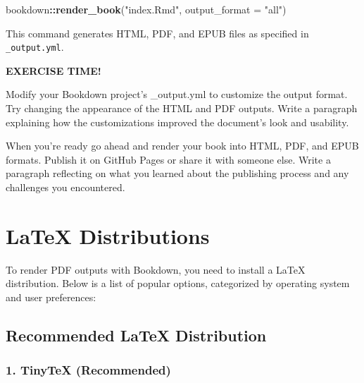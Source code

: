 \documentclass[
]{book}
\newenvironment{Shaded}{\begin{snugshade}}{\end{snugshade}}
\newcommand{\AttributeTok}[1]{\textcolor[rgb]{0.13,0.29,0.53}{#1}}
\newcommand{\FunctionTok}[1]{\textcolor[rgb]{0.13,0.29,0.53}{\textbf{#1}}}
\newcommand{\NormalTok}[1]{#1}
\newcommand{\SpecialCharTok}[1]{\textcolor[rgb]{0.81,0.36,0.00}{\textbf{#1}}}
\newcommand{\StringTok}[1]{\textcolor[rgb]{0.31,0.60,0.02}{#1}}
\newenvironment{blackbox}{
  \definecolor{shadecolor}{rgb}{0, 0, 0}  %
  \color{white}
  \begin{shaded}}
 {\end{shaded}}
\theoremstyle{definition}
\theoremstyle{definition}
\theoremstyle{definition}
\theoremstyle{definition}
\theoremstyle{remark}
\begin{document}
\begin{Shaded}
\begin{Highlighting}[]
\NormalTok{bookdown}\SpecialCharTok{::}\FunctionTok{render\_book}\NormalTok{(}\StringTok{"index.Rmd"}\NormalTok{, }\AttributeTok{output\_format =} \StringTok{"all"}\NormalTok{)}
\end{Highlighting}
\end{Shaded}

This command generates HTML, PDF, and EPUB files as specified in \texttt{\_output.yml}.

\begin{blackbox}

\begin{center}
\textbf{EXERCISE TIME!}

\end{center}

Modify your Bookdown project's \_output.yml to customize the output format. Try changing the appearance of the HTML and PDF outputs. Write a paragraph explaining how the customizations improved the document's look and usability.

When you're ready go ahead and render your book into HTML, PDF, and EPUB formats. Publish it on GitHub Pages or share it with someone else. Write a paragraph reflecting on what you learned about the publishing process and any challenges you encountered.

\end{blackbox}

\chapter{LaTeX Distributions}\label{latexdistributions}

To render PDF outputs with Bookdown, you need to install a LaTeX distribution. Below is a list of popular options, categorized by operating system and user preferences:

\section{Recommended LaTeX Distribution}\label{recommended-latex-distribution}

\subsection{\texorpdfstring{1. \textbf{TinyTeX} (Recommended)}{1. TinyTeX (Recommended)}}\label{tinytex-recommended}
\end{document}
